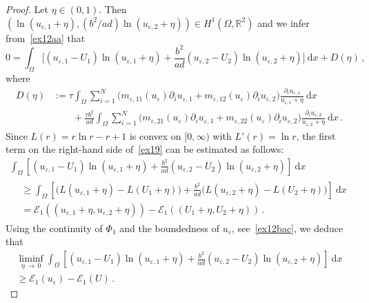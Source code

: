 \documentclass[AHL,Unicode,longabstracts,published]{cedram}
\newcommand{\bbR}{\mathbb{R}}
\newcommand{\clE}{\mathcal{E}}
\newcommand{\rmd}{\mathrm{d}}
\newcommand{\clE}{\mathcal{E}}
\begin{document}
\begin{proof}
Let $\eta\in (0,1)$. Then $\left(\ln{(u_{\varepsilon,1}+\eta)}, (b^2/ad)\ln{(u_{\varepsilon,2}+\eta) } \right)\in H^1(\Omega,\bbR^2)$ and we infer from~\eqref{ex12aa} that
\begin{equation}\label{ex19}
0 = \int_\Omega \Big[(u_{\varepsilon,1} - U_1) \ln{(u_{\varepsilon,1}+\eta)} + \frac{b^2}{ad} (u_{\varepsilon,2} - U_2)\ln{(u_{\varepsilon,2}+\eta)} \Big]\ \rmd x +D(\eta)\,,
\end{equation}
where
\begin{align*}
D(\eta)&:= \tau \int_\Omega \sum_{i=1}^N\big(m_{\varepsilon,11}(u_{\varepsilon}) \partial_i u_{\varepsilon,1} + m_{\varepsilon,12}(u_{\varepsilon}) \partial_i u_{\varepsilon,2} \big)
\frac{\partial_i u_{\varepsilon,1}}{u_{\varepsilon,1}+\eta}\ \rmd x \\[1ex]
& \qquad + \frac{\tau b^2}{ad} \int_\Omega \sum_{i=1}^N\big(m_{\varepsilon,21}(u_{\varepsilon}) \partial_i u_{\varepsilon,1} + m_{\varepsilon,22}(u_{\varepsilon}) \partial_i u_{\varepsilon,2} \big)
\frac{\partial_i u_{\varepsilon,2}}{u_{\varepsilon,2}+\eta}\ \rmd x \,.
\end{align*}
Since $L(r)=r\ln r-r+1$ is convex on $[0,\infty)$ with $L'(r)=\ln{r}$, the first term on the right-hand side of~\eqref{ex19} can be estimated as follows:
\begin{multline*}
\int_\Omega \left[(u_{\varepsilon,1} - U_1) \ln{(u_{\varepsilon,1}+\eta)} + \frac{b^2}{ad} (u_{\varepsilon,2} - U_2)\ln{(u_{\varepsilon,2}+\eta)} \right]\ \rmd x \\[1ex]
\begin{aligned}
& \ge \int_\Omega \left[\big(L(u_{\varepsilon,1}+\eta) - L(U_1+\eta)\big) + \frac{b^2}{ad}\big(L(u_{\varepsilon,2}+\eta) - L(U_2+\eta)\big) \right]\ \rmd x \\[1ex]
& = \clE_1((u_{\varepsilon,1}+\eta,u_{\varepsilon,2}+\eta))- \clE_1((U_{1}+\eta,U_{2}+\eta))\,.
\end{aligned}
\end{multline*}
Using the continuity of $\Phi_1$ and the boundedness of $u_\varepsilon$, see~\eqref{ex12bac}, we deduce that
\begin{multline}\label{ex20}
\liminf_{\eta\,\to\,0} \int_\Omega \left[(u_{\varepsilon,1} - U_1) \ln{(u_{\varepsilon,1}+\eta)} + \frac{b^2}{ad} (u_{\varepsilon,2} - U_2)\ln{(u_{\varepsilon,2}+\eta)} \right]\ \rmd x \\
\ge \clE_1(u_{ \varepsilon})- \clE_1(U)\,. 
\end{multline}

\end{proof}
\end{document}
